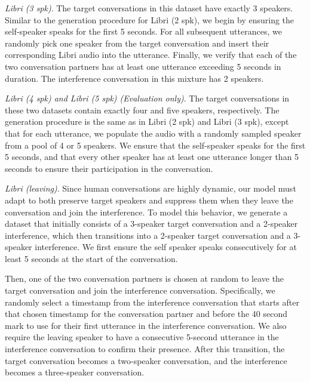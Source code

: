 \vskip 0.02in\noindent\textit{Libri (3 spk)}. The target conversations in this dataset have exactly 3 speakers. Similar to the generation procedure for Libri (2 spk), we begin by ensuring the self-speaker speaks for the first 5 seconds. For all subsequent utterances, we randomly pick one speaker from the target conversation and insert their corresponding Libri audio into the utterance. Finally, we verify that each of the two conversation partners has at least one utterance exceeding 5 seconds in duration. The interference conversation in this mixture has 2 speakers.

\vskip 0.02in\noindent\textit{Libri (4 spk) and Libri (5 spk) (Evaluation only)}. {The target conversations in these two datasets contain exactly four and five speakers, respectively. The generation procedure is the same as in Libri (2 spk) and Libri (3 spk), except that for each utterance, we populate the audio with a randomly sampled speaker from a pool of 4 or 5 speakers. We ensure that the self-speaker speaks for the first 5 seconds, and that every other speaker has at least one utterance longer than 5 seconds to ensure their participation in the conversation.}

\vskip 0.02in\noindent\textit{Libri (leaving)}. Since human conversations are highly dynamic, our model must adapt to both preserve target speakers and suppress them when they leave the conversation and join the interference. To model this behavior, we generate a dataset that initially consists of a 3-speaker target conversation and a 2-speaker interference, which then transitions into a 2-speaker target conversation and a 3-speaker interference. We first ensure the self speaker speaks consecutively for at least 5 seconds at the start of the conversation. %

Then, one of the two conversation partners is chosen at random to leave the target conversation and join the interference conversation. Specifically, we randomly select a timestamp from the interference conversation that starts after that chosen timestamp for the conversation partner and before the 40 second mark to use for their first utterance in the interference conversation. We also require the leaving speaker to have a consecutive 5-second utterance in the interference conversation to confirm their presence. After this transition, the target conversation becomes a two-speaker conversation, and the interference becomes a three-speaker conversation.


